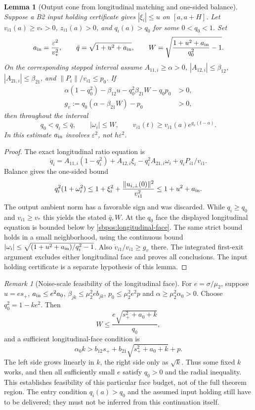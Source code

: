 \documentclass{article} %
\theoremstyle{plain}
\newtheorem{lemma}[theorem]{Lemma}
\theoremstyle{definition}
\theoremstyle{remark}
\newtheorem{remark}[theorem]{Remark}
\begin{document}
\begin{lemma}[Output cone from longitudinal matching and one-sided balance]
\label{sbpos:longitudinal-barrier}
Suppose a B2 input holding certificate gives $|\xi_i|\le u$ on $[a,a+H]$.
Let $v_{i1}(a)\ge v_*>0$, $z_{i1}(a)>0$, and $q_i(a)>q_0$ for some
$0<q_0<1$. Set
\[
 a_{\rm in}=\frac{\varepsilon^2}{v_*^2},\qquad
 \bar q=\sqrt{1+u^2+a_{\rm in}},\qquad
 W=\sqrt{\frac{1+u^2+a_{\rm in}}{q_0^2}-1}.
\]
On the corresponding stopped interval assume
$A_{11,i}\ge\alpha>0$, $|A_{12,i}|\le\beta_{12}$,
$|A_{21,i}|\le\beta_{21}$, and $\|P_i\|/v_{i1}\le p_0$.
If
\begin{align}
 \alpha(1-q_0^2)-\beta_{12}u-q_0^2\beta_{21}W-q_0p_0&>0,
 \label{sbpos:longitudinal-face}\\
 g_v:=q_0(\alpha-\beta_{21}W)-p_0&>0,\label{sbpos:radial-face}
\end{align}
then throughout the interval
\[
 q_0<q_i\le\bar q,\qquad |\omega_i|\le W,\qquad
 v_{i1}(t)\ge v_{i1}(a)e^{g_v(t-a)}.
\]
In this estimate $a_{\rm in}$ involves $\varepsilon^2$, not
$h\varepsilon^2$.
\end{lemma}
\begin{proof}
The exact longitudinal ratio equation is
\[
 \dot q_i=A_{11,i}(1-q_i^2)+A_{12,i}\xi_i
                  -q_i^2 A_{21,i}\omega_i+q_iP_{i1}/v_{i1}.
\]
Balance gives the one-sided bound
\[
 q_i^2(1+\omega_i^2)
 \le 1+\xi_i^2+\frac{\|u_{i,\perp}(0)\|^2}{v_{i1}^2}
 \le1+u^2+a_{\rm in}.
\]
The output ambient norm has a favorable sign and was discarded.
While $q_i\ge q_0$ and $v_{i1}\ge v_*$ this yields the stated $\bar q,W$.
At the $q_0$ face the displayed longitudinal equation is bounded below
by \eqref{sbpos:longitudinal-face}. The same strict bound holds in a
small neighborhood, using the continuous bound
$|\omega_i|\le\sqrt{(1+u^2+a_{\rm in})/q_i^2-1}$.
Also $\dot v_{i1}/v_{i1}\ge g_v$ there.
The integrated first-exit argument excludes either longitudinal face and
proves all conclusions. The input holding certificate is a separate
hypothesis of this lemma.
\end{proof}

\begin{remark}[Noise-scale feasibility of the longitudinal face]
For $e=\sigma/\mu_2$, suppose
$u=e s_+$, $a_{\rm in}\le e^2 a_0$,
$\beta_{jk}\le\mu_2^2e b_{jk}$, $p_0\le\mu_2^2e^2p$ and
$\alpha\ge\mu_2^2\alpha_0>0$.
Choose $q_0^2=1-k e^2$. Then
\[
 W\le\frac{e\sqrt{s_+^2+a_0+k}}{q_0},
\]
and a sufficient longitudinal-face condition is
\[
 \alpha_0 k>b_{12}s_++b_{21}\sqrt{s_+^2+a_0+k}+p.
\]
The left side grows linearly in $k$, the right side only as $\sqrt{k}$.
Thus some fixed $k$ works, and then all sufficiently small $e$ satisfy
$q_0>0$ and the radial inequality. This establishes feasibility of this
particular face budget, not of the full theorem region.
The entry condition $q_i(a)>q_0$ and the assumed input holding still have
to be delivered; they must not be inferred from this continuation itself.
\end{remark}
\end{document}
